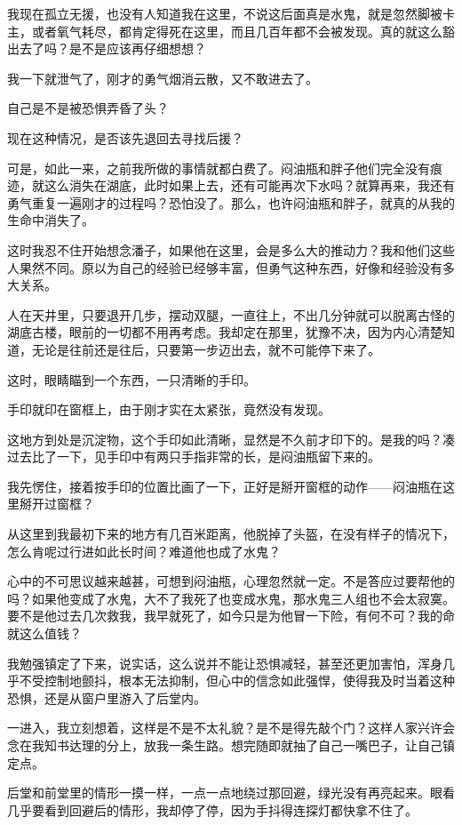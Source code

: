 我现在孤立无援，也没有人知道我在这里，不说这后面真是水鬼，就是忽然脚被卡主，或者氧气耗尽，都肯定得死在这里，而且几百年都不会被发现。真的就这么豁出去了吗？是不是应该再仔细想想？

我一下就泄气了，刚才的勇气烟消云散，又不敢进去了。

自己是不是被恐惧弄昏了头？

现在这种情况，是否该先退回去寻找后援？

可是，如此一来，之前我所做的事情就都白费了。闷油瓶和胖子他们完全没有痕迹，就这么消失在湖底，此时如果上去，还有可能再次下水吗？就算再来，我还有勇气重复一遍刚才的过程吗？恐怕没了。那么，也许闷油瓶和胖子，就真的从我的生命中消失了。

这时我忍不住开始想念潘子，如果他在这里，会是多么大的推动力？我和他们这些人果然不同。原以为自己的经验已经够丰富，但勇气这种东西，好像和经验没有多大关系。

人在天井里，只要退开几步，摆动双腿，一直往上，不出几分钟就可以脱离古怪的湖底古楼，眼前的一切都不用再考虑。我却定在那里，犹豫不决，因为内心清楚知道，无论是往前还是往后，只要第一步迈出去，就不可能停下来了。

这时，眼睛瞄到一个东西，一只清晰的手印。

手印就印在窗框上，由于刚才实在太紧张，竟然没有发现。

这地方到处是沉淀物，这个手印如此清晰，显然是不久前才印下的。是我的吗？凑过去比了一下，见手印中有两只手指非常的长，是闷油瓶留下来的。

我先愣住，接着按手印的位置比画了一下，正好是掰开窗框的动作——闷油瓶在这里掰开过窗框？

从这里到我最初下来的地方有几百米距离，他脱掉了头盔，在没有样子的情况下，怎么肯呢过行进如此长时间？难道他也成了水鬼？

心中的不可思议越来越甚，可想到闷油瓶，心理忽然就一定。不是答应过要帮他的吗？如果他变成了水鬼，大不了我死了也变成水鬼，那水鬼三人组也不会太寂寞。要不是他过去几次救我，我早就死了，如今只是为他冒一下险，有何不可？我的命就这么值钱？

我勉强镇定了下来，说实话，这么说并不能让恐惧减轻，甚至还更加害怕，浑身几乎不受控制地颤抖，根本无法抑制，但心中的信念如此强悍，使得我及时当着这种恐惧，还是从窗户里游入了后堂内。

一进入，我立刻想着，这样是不是不太礼貌？是不是得先敲个门？这样人家兴许会念在我知书达理的分上，放我一条生路。想完随即就抽了自己一嘴巴子，让自己镇定点。

后堂和前堂里的情形一摸一样，一点一点地绕过那回避，绿光没有再亮起来。眼看几乎要看到回避后的情形，我却停了停，因为手抖得连探灯都快拿不住了。

